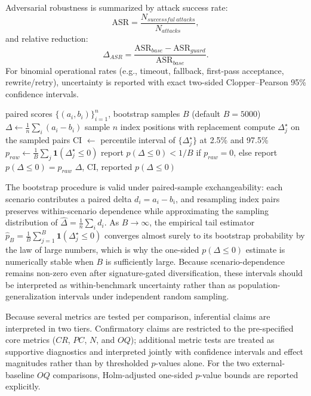 ﻿\documentclass[a4paper,12pt]{article}
\newcommand{\ind}{\mathbf{1}}
\newcommand{\BootstrapSamples}{5000}
\begin{document}
Adversarial robustness is summarized by attack success rate:
\begin{equation}
\mathrm{ASR}=\frac{N_{successful\ attacks}}{N_{attacks}},
\end{equation}
and relative reduction:
\begin{equation}
\Delta_{ASR}= \frac{\mathrm{ASR}_{base}-\mathrm{ASR}_{guard}}{\mathrm{ASR}_{base}}.
\end{equation}
For binomial operational rates (e.g., timeout, fallback, first-pass acceptance, rewrite/retry), uncertainty is reported with exact two-sided Clopper--Pearson 95\% confidence intervals.

\begin{algorithm}[H]
\caption{Paired bootstrap significance}
\begin{algorithmic}[1]
\Require paired scores \(\{(a_i,b_i)\}_{i=1}^{n}\), bootstrap samples \(B\) (default \(B=\BootstrapSamples\))
\State \(\Delta \gets \frac{1}{n}\sum_i(a_i-b_i)\)
\State sample \(n\) index positions with replacement
\State compute \(\Delta_j^\star\) on the sampled pairs
\EndFor
\State CI \(\gets\) percentile interval of \(\{\Delta_j^\star\}\) at 2.5\% and 97.5\%
\State \(p_{raw}\gets \frac{1}{B}\sum_j \ind(\Delta_j^\star\le0)\)
\State report \(p(\Delta\le0)<1/B\) if \(p_{raw}=0\), else report \(p(\Delta\le0)=p_{raw}\)
\State \Return \(\Delta\), CI, reported \(p(\Delta\le0)\)
\end{algorithmic}
\end{algorithm}

The bootstrap procedure is valid under paired-sample exchangeability: each scenario contributes a paired delta \(d_i=a_i-b_i\), and resampling index pairs preserves within-scenario dependence while approximating the sampling distribution of \(\hat{\Delta}=\frac{1}{n}\sum_i d_i\). As \(B\to\infty\), the empirical tail estimator
\(\hat{p}_B=\frac{1}{B}\sum_{j=1}^{B}\ind(\Delta_j^\star\le0)\)
converges almost surely to its bootstrap probability by the law of large numbers, which is why the one-sided \(p(\Delta\le0)\) estimate is numerically stable when \(B\) is sufficiently large.
Because scenario-dependence remains non-zero even after signature-gated diversification, these intervals should be interpreted as within-benchmark uncertainty rather than as population-generalization intervals under independent random sampling.

Because several metrics are tested per comparison, inferential claims are interpreted in two tiers. Confirmatory claims are restricted to the pre-specified core metrics (\(CR\), \(PC\), \(N\), and \(OQ\)); additional metric tests are treated as supportive diagnostics and interpreted jointly with confidence intervals and effect magnitudes rather than by thresholded \(p\)-values alone. For the two external-baseline \(OQ\) comparisons, Holm-adjusted one-sided \(p\)-value bounds are reported explicitly.
\end{document}
